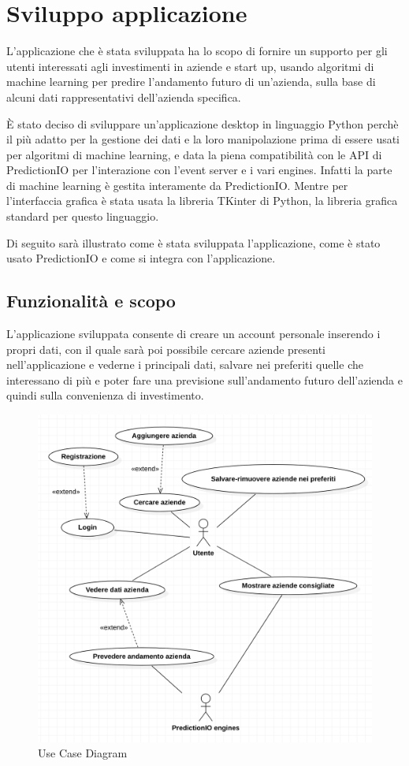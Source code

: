 \chapter{Sviluppo applicazione}\label{c:applicazione}

L'applicazione che è stata sviluppata ha lo scopo di fornire un supporto per gli utenti interessati agli investimenti in aziende e start up, usando algoritmi di machine learning per predire l'andamento futuro di un'azienda, sulla base di alcuni dati rappresentativi dell'azienda specifica. 

È stato deciso di sviluppare un'applicazione desktop in linguaggio Python perchè il più adatto per la gestione dei dati e la loro manipolazione prima di essere usati per algoritmi di machine learning, e data la piena compatibilità con le API di PredictionIO per l'interazione con l'event server e i vari engines. Infatti la parte di machine learning è gestita interamente da PredictionIO. Mentre per l'interfaccia grafica è stata usata la libreria TKinter di Python, la libreria grafica standard per questo linguaggio.

Di seguito sarà illustrato come è stata sviluppata l'applicazione, come è stato usato PredictionIO e come si integra con l'applicazione.

\section{Funzionalità e scopo}
L'applicazione sviluppata consente di creare un account personale inserendo i propri dati, con il quale sarà poi possibile cercare aziende presenti nell'applicazione e vederne i principali dati, salvare nei preferiti quelle che interessano di più e poter fare una previsione sull'andamento futuro dell'azienda e quindi sulla convenienza di investimento. 

\begin{figure}[!h]
\includegraphics[width=1.0\textwidth]{immagini/usecase.png}
\caption{Use Case Diagram}
\label{fig:usecase}
\end{figure}

